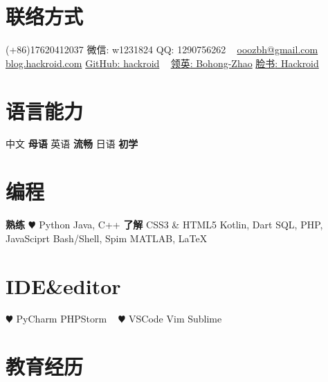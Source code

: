 \documentclass[hidelinks__VERSION__]{adamyi-cv}
\begin{document}



\begin{aside} %
\section{\heir 联络方式}
(+86)17620412037
{\hei 微信\textrm{: w1231824}}
{\hei QQ\textrm{: 1290756262}}
~
\href{mailto:ooozbh@gmail.com}{ooozbh@gmail.com}
\href{https://blog.hackroid.com}{blog.hackroid.com}
\href{https://github.com/hackroid}{GitHub: hackroid}
~
\href{https://www.linkedin.com/in/%E5%8D%9A%E5%BC%98-%E8%B5%B5-b7ab09136/}{\hei 领英\textrm{: Bohong-Zhao}}
\href{https://www.facebook.com/Hackro1d}{\hei 脸书\textrm{: Hackroid}}
\section{\heir 语言能力}
{\hei 中文 \textbf{\hei 母语}
\hei 英语 \textbf{\hei 流畅}
\hei 日语 \textbf{\hei 初学}}
\section{\heir 编程}
\textbf{\hei 熟练}
{\color{red} $\varheart$} Python
Java, C++
\textbf{\hei 了解}
CSS3 \& HTML5
Kotlin, Dart
SQL, PHP, JavaSciprt
Bash/Shell, Spim
MATLAB, \LaTeX
\section{IDE\&editor}
{\color{red} $\varheart$} PyCharm
PHPStorm
~
{\color{red} $\varheart$} VSCode
Vim
Sublime
\versionsection
\end{aside}


\section{\heir 教育\heir 经历}
\end{document}
